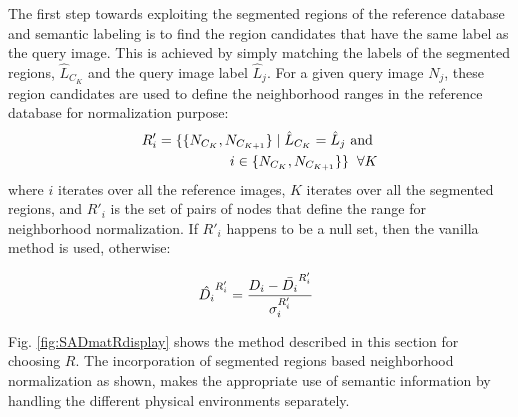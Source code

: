 \documentclass[letterpaper, 10 pt, conference]{ieeeconf}  %
\begin{document}
The first step towards exploiting the segmented regions of the reference database and semantic labeling is to find the region candidates that have the same label as the query image. This is achieved by simply matching the labels of the segmented regions, $\hat{L}_{C_K}$ and the query image label $\hat{L}_j$. For a given query image $N_j$, these region candidates are used to define the neighborhood ranges in the reference database for normalization purpose:
\begin{equation}
\begin{split}
 R'_i = \{\{N_{C_K},N_{C_{K+1}}\}\mid\hat{L}_{C_K}=\hat{L}_j \text{ and } \\
 i\in\{N_{C_K},N_{C_{K+1}}\} \} \hspace{0.2cm}\forall K
\end{split}
\end{equation}
where $i$ iterates over all the reference images, $K$ iterates over all the segmented regions, and $R'_i$ is the set of pairs of nodes that define the range for neighborhood normalization. If $R'_i$ happens to be a null set, then the vanilla method is used, otherwise:

\begin{equation}
 \hat{D_i}^{R'_i} = \frac{D_i-\bar{D_i}^{R'_i}}{\sigma_i^{R'_i}} \hspace{0.2cm}
 \label{eq:normScoreNew}
\end{equation}

Fig. \ref{fig:SADmatRdisplay} shows the method described in this section for choosing $R$. The incorporation of segmented regions based neighborhood normalization as shown, makes the appropriate use of semantic information by handling the different physical environments separately.
\end{document}
